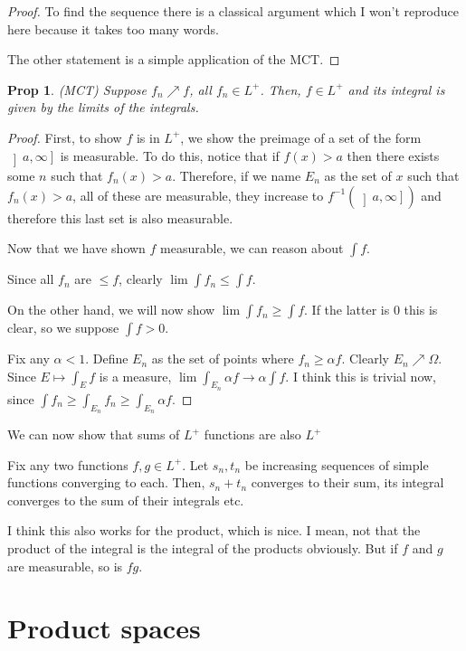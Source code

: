 \documentclass{article}
\newtheorem{prop}{Prop}
\theoremstyle{definition}
\begin{document}
	\begin{proof}
	To find the sequence there is a classical argument which I won't reproduce here because it takes too many words.
	
	The other statement is a simple application of the MCT.
	\end{proof}
	
	\begin{prop}
	(MCT) Suppose $f_n \nearrow f$, all $f_n \in L^+$. Then, $f \in L^+$ and its integral is given by the limits of the integrals.
	\end{prop}
	
	\begin{proof}
	First, to show $f$ is in $L^+$, we show the preimage of a set of the form $\left]a, \infty\right]$ is measurable. To do this, notice that if $f(x) > a$ then there exists some $n$ such that $f_n(x) > a$. Therefore, if we name $E_n$ as the set of $x$ such that $f_n(x) > a$, all of these are measurable, they increase to $f^{-1}(\left]a, \infty\right])$ and therefore this last set is also measurable.
	
	Now that we have shown $f$ measurable, we can reason about $\int f$. 
	
	Since all $f_n$ are $\leq f$, clearly $\lim \int f_n \leq \int f$.
	
	On the other hand, we will now show $\lim \int f_n \geq \int f$. If the latter is 0 this is clear, so we suppose $\int f > 0$.
	
	Fix any $\alpha < 1$. Define $E_n$ as the set of points where $f_n \geq \alpha f$. Clearly $E_n \nearrow \Omega$. Since $E \mapsto \int_E f$ is a measure, $\lim \int_{E_n} \alpha f \rightarrow \alpha \int f$. I think this is trivial now, since $\int f_n \geq \int_{E_n} f_n \geq \int_{E_n} \alpha f$.
	\end{proof}
	
	We can now show that sums of $L^+$ functions are also $L^+$
	
	Fix any two functions $f, g \in L^+$. Let $s_n, t_n$ be increasing sequences of simple functions converging to each. Then, $s_n + t_n$ converges to their sum, its integral converges to the sum of their integrals etc.
	
	I think this also works for the product, which is nice. I mean, not that the product of the integral is the integral of the products obviously. But if $f$ and $g$ are measurable, so is $fg$.
	
	\section{Product spaces}
	
\end{document}
